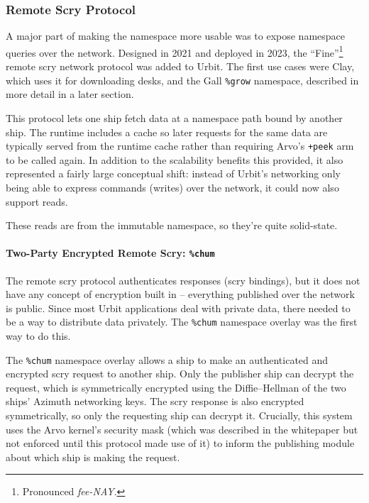 \documentclass[twoside]{article}
\begin{document}
\subsubsection{Remote Scry Protocol}

A major part of making the namespace more usable was to expose namespace queries over the network.  Designed in 2021 and deployed in 2023, the ``Fine''\footnote{Pronounced \emph{fee-NAY}.} remote scry network protocol was added to Urbit.  The first use cases were Clay, which uses it for downloading desks, and the Gall \lstinline[style=inlinecode]{%grow} namespace, described in more detail in a later section.

This protocol lets one ship fetch data at a namespace path bound by another ship.  The runtime includes a cache so later requests for the same data are typically served from the runtime cache rather than requiring Arvo's \lstinline[style=inlinecode]{+peek} arm to be called again.  In addition to the scalability benefits this provided, it also represented a fairly large conceptual shift: instead of Urbit's networking only being able to express commands (writes) over the network, it could now also support reads.

These reads are from the immutable namespace, so they're quite solid-state.

\paragraph{Two-Party Encrypted Remote Scry: \texttt{\%chum}}  The remote scry protocol authenticates responses (scry bindings), but it does not have any concept of encryption built in – everything published over the network is public.  Since most Urbit applications deal with private data, there needed to be a way to distribute data privately.  The \lstinline[style=inlinecode]{%chum} namespace overlay was the first way to do this.

The \lstinline[style=inlinecode]{%chum} namespace overlay allows a ship to make an authenticated and encrypted scry request to another ship.  Only the publisher ship can decrypt the request, which is symmetrically encrypted using the Diffie–Hellman of the two ships' Azimuth networking keys.  The scry response is also encrypted symmetrically, so only the requesting ship can decrypt it.  Crucially, this system uses the Arvo kernel's security mask (which was described in the whitepaper but not enforced until this protocol made use of it) to inform the publishing module about which ship is making the request.
\end{document}
